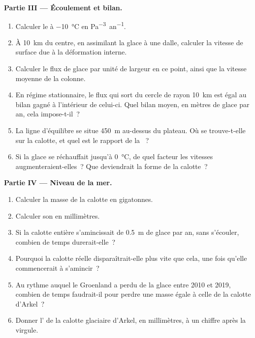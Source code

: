 \begin{problem}
\medskip\noindent\textbf{Partie III --- Écoulement et bilan.}
\begin{enumerate}[resume]
\item Calculer le  à \qty{-10}{\celsius} en
  \unit{Pa^{-3}.an^{-1}}.
\item À \qty{10}{km} du centre, en assimilant la glace à une dalle, calculer la
  vitesse de surface due à la déformation interne.
\item Calculer le flux de glace par unité de largeur en ce point, ainsi que la
  vitesse moyenne de la colonne.
\item En régime stationnaire, le flux qui sort du cercle de rayon
  \qty{10}{km} est égal au bilan gagné à l'intérieur de celui-ci. Quel bilan
  moyen, en mètres de glace par an, cela impose-t-il~?
\item La ligne d'équilibre se situe \qty{450}{m} au-dessus du plateau. Où se
  trouve-t-elle sur la calotte, et quel est le rapport de la ~?
\item Si la glace se réchauffait jusqu'à \qty{0}{\celsius}, de quel facteur les
  vitesses augmenteraient-elles~? Que deviendrait la forme de la calotte~?
\end{enumerate}

\medskip\noindent\textbf{Partie IV --- Niveau de la mer.}
\begin{enumerate}[resume]
\item Calculer la masse de la calotte en gigatonnes.
\item Calculer son  en millimètres.
\item Si la calotte entière s'amincissait de \qty{0.5}{m} de glace par an, sans
  s'écouler, combien de temps durerait-elle~?
\item Pourquoi la calotte réelle disparaîtrait-elle plus vite que cela, une fois
  qu'elle commencerait à s'amincir~?
\item Au rythme auquel le Groenland a perdu de la glace entre 2010 et 2019, combien
  de temps faudrait-il pour perdre une masse égale à celle de la calotte d'Arkel~?
\item Donner l' de la calotte glaciaire d'Arkel, en
  millimètres, à un chiffre après la virgule.
\end{enumerate}
\end{problem}
